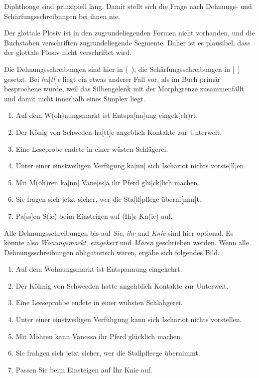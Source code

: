  Diphthonge sind prinzipiell lang.
Damit stellt sich die Frage nach Dehnungs- und Schärfungsschreibungen bei ihnen nie.

 Der glottale Plosiv ist in den zugrundeliegenden Formen nicht vorhanden, und die Buchstaben verschriften zugrundeliegende Segmente.
Daher ist es plausibel, dass der glottale Plosiv nicht verschriftet wird.


Die Dehnungsschreibungen sind hier in (~), die Schärfungsschreibungen in [~] gesetzt.
Bei \textit{ha}[\textit{tt}]\textit{e} liegt ein etwas anderer Fall vor, als im Buch primär besprochene wurde, weil das Silbengelenk mit der Morphgrenze zusammenfällt und damit nicht innerhalb eines Simplex liegt.

\begin{sloppypar}
\begin{enumerate}\Lf
  \item Auf dem W(oh)nungsmarkt ist Entspa[nn]ung eingek(eh)rt.
  \item Der König von Schweden ha[tt]e angeblich Kontakte zur Unterwelt.
  \item Eine Leseprobe endete in einer wüsten Schlägerei.
  \item Unter einer einstweiligen Verfügung ka[nn] sich Ischariot nichts vorste[ll]en.
  \item Mit M(öh)ren ka[nn] Vane[ss]a ihr Pferd glü[ck]lich machen.
  \item Sie fragen sich jetzt sicher, wer die Sta[ll]pflege überni[mm]t.
  \item Pa[ss]en S(ie) beim Einsteigen auf (Ih)r Kn(ie) auf. 
\end{enumerate}
\end{sloppypar}

Alle Dehnungsschreibungen bis auf \textit{Sie}, \textit{ihr} und \textit{Knie} sind hier optional.
Es könnte also \textit{Wonungsmarkt}, \textit{eingekert} und \textit{Mören} geschrieben werden.
Wenn alle Dehnungsschreibungen obligatorisch wären, ergäbe sich \zB folgendes Bild.

\begin{enumerate}\Lf
  \item Auf dem Wohnungsmarkt ist Entspannung eingekehrt.
  \item Der Köhnig von Schweeden hatte angehblich Kontakte zur Unterwelt.
  \item Eine Leeseprohbe endete in einer wühsten Schlähgerei.
  \item Unter einer einstweiligen Verfühgung kann sich Ischariot nichts vorstellen.
  \item Mit Möhren kann Vanessa ihr Pferd glücklich machen.
  \item Sie frahgen sich jetzt sicher, wer die Stallpfleege übernimmt.
  \item Passen Sie beim Einsteigen auf Ihr Knie auf. 
\end{enumerate}

